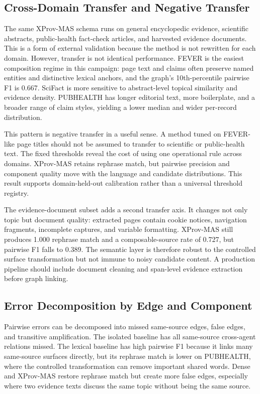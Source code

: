 \documentclass{ieeeaccess}
\begin{document}
\subsection{Cross-Domain Transfer and Negative Transfer}
The same XProv-MAS schema runs on general encyclopedic evidence, scientific abstracts, public-health fact-check articles, and harvested evidence documents. This is a form of external validation because the method is not rewritten for each domain. However, transfer is not identical performance. FEVER is the easiest composition regime in this campaign: page text and claims often preserve named entities and distinctive lexical anchors, and the graph's 10th-percentile pairwise F1 is 0.667. SciFact is more sensitive to abstract-level topical similarity and evidence density. PUBHEALTH has longer editorial text, more boilerplate, and a broader range of claim styles, yielding a lower median and wider per-record distribution.

This pattern is negative transfer in a useful sense. A method tuned on FEVER-like page titles should not be assumed to transfer to scientific or public-health text. The fixed thresholds reveal the cost of using one operational rule across domains. XProv-MAS retains rephrase match, but pairwise precision and component quality move with the language and candidate distributions. This result supports domain-held-out calibration rather than a universal threshold registry.

The evidence-document subset adds a second transfer axis. It changes not only topic but document quality: extracted pages contain cookie notices, navigation fragments, incomplete captures, and variable formatting. XProv-MAS still produces 1.000 rephrase match and a composable-source rate of 0.727, but pairwise F1 falls to 0.389. The semantic layer is therefore robust to the controlled surface transformation but not immune to noisy candidate content. A production pipeline should include document cleaning and span-level evidence extraction before graph linking.

\subsection{Error Decomposition by Edge and Component}
Pairwise errors can be decomposed into missed same-source edges, false edges, and transitive amplification. The isolated baseline has all same-source cross-agent relations missed. The lexical baseline has high pairwise F1 because it links many same-source surfaces directly, but its rephrase match is lower on PUBHEALTH, where the controlled transformation can remove important shared words. Dense and XProv-MAS restore rephrase match but create more false edges, especially where two evidence texts discuss the same topic without being the same source.
\end{document}
